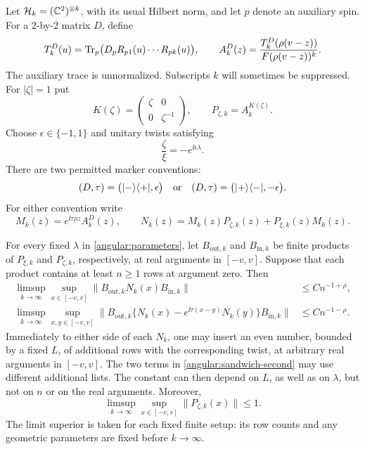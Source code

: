 Let $\mathcal H_k=(\mathbb C^2)^{\otimes k}$, with its usual Hilbert norm,
and let $p$ denote an auxiliary spin.  For a $2$-by-$2$ matrix $D$,
define
\begin{equation}\label{angular:rows}
 T_k^D(u)=\operatorname{Tr}_p\bigl(D_pR_{p1}(u)\cdots R_{pk}(u)\bigr),\qquad
 A_k^D(z)=\frac{T_k^D(\rho(v-z))}{F(\rho(v-z))^k}.
\end{equation}
The auxiliary trace is unnormalized.  Subscripts $k$ will sometimes be
suppressed.  For $|\zeta|=1$ put
\begin{equation}\label{angular:twist-rows}
 K(\zeta)=\begin{pmatrix}\zeta&0\\0&\zeta^{-1}\end{pmatrix},
 \qquad P_{\zeta,k}=A_k^{K(\zeta)}.
\end{equation}
Choose $\epsilon\in\{-1,1\}$ and unitary twists satisfying
\begin{equation}\label{angular:twist-ratio}
 \frac\zeta\xi=-e^{\ii\epsilon\lambda}.
\end{equation}
There are two permitted marker conventions:
\begin{equation}\label{angular:marker-convention}
 (D,\tau)=\bigl(|-\rangle\langle+|,\epsilon\bigr)
 \quad\hbox{or}\quad
 (D,\tau)=\bigl(|+\rangle\langle-|,-\epsilon\bigr).
\end{equation}
For either convention write
\begin{equation}\label{angular:MN}
 M_k(z)=e^{\ii\tau\rho z}A_k^D(z),\qquad
 N_k(z)=M_k(z)P_{\zeta,k}(z)+P_{\xi,k}(z)M_k(z).
\end{equation}

\begin{theorem}\label{thm:angular-transfer}
For every fixed $\lambda$ in \eqref{angular:parameters}, let
$B_{\mathrm{out},k}$ and $B_{\mathrm{in},k}$ be finite products of
$P_{\xi,k}$ and $P_{\zeta,k}$, respectively, at real arguments in
$[-v,v]$.  Suppose that each product contains at least $n\ge1$ rows
at argument zero.  Then
\begin{align}
 \limsup_{k\to\infty}\sup_{x\in[-v,v]}
 \|B_{\mathrm{out},k}N_k(x)B_{\mathrm{in},k}\|
 &\le C n^{-1+\rho},\label{angular:sandwich-first}\\
 \limsup_{k\to\infty}\sup_{x,y\in[-v,v]}
 \|B_{\mathrm{out},k}
   \{N_k(x)-e^{\ii\tau(x-y)}N_k(y)\}B_{\mathrm{in},k}\|
 &\le C n^{-1-\rho}.\label{angular:sandwich-second}
\end{align}
Immediately to either side of each $N_k$, one may insert an even
number, bounded by a fixed $L$, of additional rows with the
corresponding twist, at arbitrary real arguments in $[-v,v]$.
The two terms in \eqref{angular:sandwich-second} may use different
additional lists.  The constant can then depend on $L$, as well as
on $\lambda$, but not on $n$ or on the real arguments.
Moreover,
\begin{equation}\label{angular:contraction}
 \limsup_{k\to\infty}\sup_{x\in[-v,v]}
       \|P_{\zeta,k}(x)\|\le1.
\end{equation}
The limit superior is taken for each fixed finite setup: its row
counts and any geometric parameters are fixed before $k\to\infty$.
\end{theorem}

